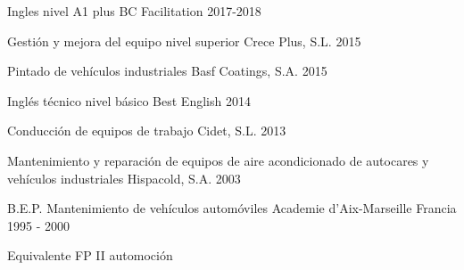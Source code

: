 

\begin{cventries}

  \cventry
    {Ingles nivel A1 plus} %
    {BC Facilitation} %
    {} %
    {2017-2018} %
    {}

  \cventry
    {Gestión y mejora del equipo nivel superior} %
    {Crece Plus, S.L.} %
    {} %
    {2015} %
    {}

  \cventry
    {Pintado de vehículos industriales} %
    {Basf Coatings, S.A.} %
    {} %
    {2015} %
    {}

  \cventry
    {Inglés técnico nivel básico} %
    {Best English} %
    {} %
    {2014} %
    {}

  \cventry
    {Conducción de equipos de trabajo} %
    {Cidet, S.L.} %
    {} %
    {2013} %
    {}

  \cventry
    {Mantenimiento y reparación de equipos de aire acondicionado de autocares y vehículos industriales} %
    {Hispacold, S.A.} %
    {} %
    {2003} %
    {}

  \cventry
    {B.E.P. Mantenimiento de vehículos automóviles} %
    {Academie d’Aix-Marseille} %
    {Francia} %
    {1995 - 2000} %
    {
      \begin{cvitems} %
        \item {Equivalente FP II automoción}
      \end{cvitems}
    }

\end{cventries}
